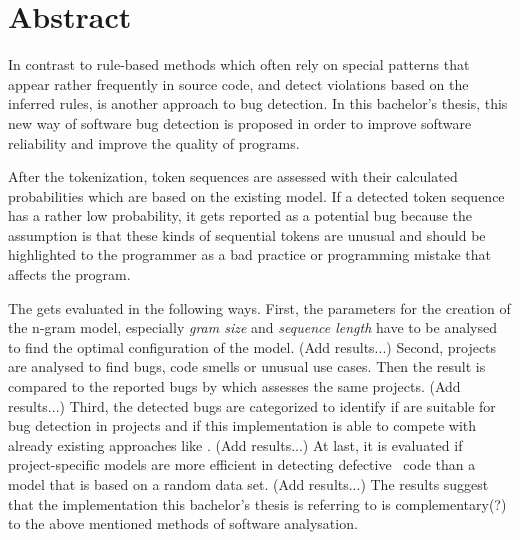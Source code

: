 \chapter*{Abstract}

In contrast to rule-based methods which often rely on special patterns that appear rather frequently in source code, and detect violations based on the inferred rules, \ngram{} is another approach to bug detection. In this bachelor's thesis, this new way of software bug detection is proposed in order to improve software reliability and improve the quality of \scratch{} programs.

After the tokenization, token sequences are assessed with their calculated probabilities which are based on the existing model. If a detected token sequence has a rather low probability, it gets reported as a potential bug because the assumption is that these kinds of sequential tokens are unusual and should be highlighted to the programmer as a bad practice or programming mistake that affects the program.

The \ngram{} gets evaluated in the following ways. First, the parameters for the creation of the n-gram model, especially \textit{gram size} and \textit{sequence length} have to be analysed to find the optimal configuration of the model. (Add results...) Second, \scratch{} projects are analysed to find bugs, code smells or unusual use cases. Then the result is compared to the reported bugs by \litterbox{} which assesses the same projects. (Add results...) Third, the detected bugs are categorized to identify if  are suitable for bug detection in \scratch{} projects and if this implementation is able to compete with already existing approaches like \litterbox{}. (Add results...) At last, it is evaluated if project-specific models are more efficient in detecting defective \scratch\ code than a model that is based on a random data set. (Add results...) The results suggest that the implementation this bachelor's thesis is referring to is complementary(?) to the above mentioned methods of software analysation.